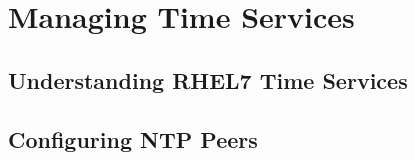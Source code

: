 \chapter{Managing Time Services}

\section{Understanding RHEL7 Time Services}
\section{Configuring NTP Peers}
